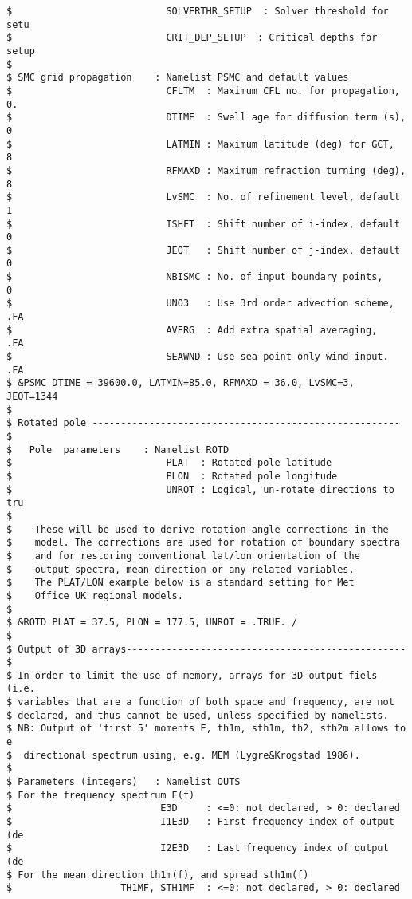 \begin{footnotesize}
\begin{verbatim}
$                           SOLVERTHR_SETUP  : Solver threshold for setu
$                           CRIT_DEP_SETUP  : Critical depths for setup 
$
$ SMC grid propagation    : Namelist PSMC and default values
$                           CFLTM  : Maximum CFL no. for propagation, 0.
$                           DTIME  : Swell age for diffusion term (s), 0
$                           LATMIN : Maximum latitude (deg) for GCT,   8
$                           RFMAXD : Maximum refraction turning (deg), 8
$                           LvSMC  : No. of refinement level, default 1 
$                           ISHFT  : Shift number of i-index, default 0 
$                           JEQT   : Shift number of j-index, default 0 
$                           NBISMC : No. of input boundary points,    0 
$                           UNO3   : Use 3rd order advection scheme, .FA
$                           AVERG  : Add extra spatial averaging,    .FA
$                           SEAWND : Use sea-point only wind input.  .FA
$ &PSMC DTIME = 39600.0, LATMIN=85.0, RFMAXD = 36.0, LvSMC=3, JEQT=1344 
$
$ Rotated pole ------------------------------------------------------ $
$   Pole  parameters    : Namelist ROTD
$                           PLAT  : Rotated pole latitude
$                           PLON  : Rotated pole longitude
$                           UNROT : Logical, un-rotate directions to tru
$
$    These will be used to derive rotation angle corrections in the
$    model. The corrections are used for rotation of boundary spectra 
$    and for restoring conventional lat/lon orientation of the
$    output spectra, mean direction or any related variables.
$    The PLAT/LON example below is a standard setting for Met
$    Office UK regional models.
$
$ &ROTD PLAT = 37.5, PLON = 177.5, UNROT = .TRUE. /
$
$ Output of 3D arrays------------------------------------------------- $
$ In order to limit the use of memory, arrays for 3D output fiels (i.e. 
$ variables that are a function of both space and frequency, are not 
$ declared, and thus cannot be used, unless specified by namelists.
$ NB: Output of 'first 5' moments E, th1m, sth1m, th2, sth2m allows to e
$  directional spectrum using, e.g. MEM (Lygre&Krogstad 1986). 
$
$ Parameters (integers)   : Namelist OUTS
$ For the frequency spectrum E(f)     
$                          E3D     : <=0: not declared, > 0: declared
$                          I1E3D   : First frequency index of output (de
$                          I2E3D   : Last frequency index of output  (de
$ For the mean direction th1m(f), and spread sth1m(f)     
$                   TH1MF, STH1MF  : <=0: not declared, > 0: declared

\end{verbatim}
\end{footnotesize}
